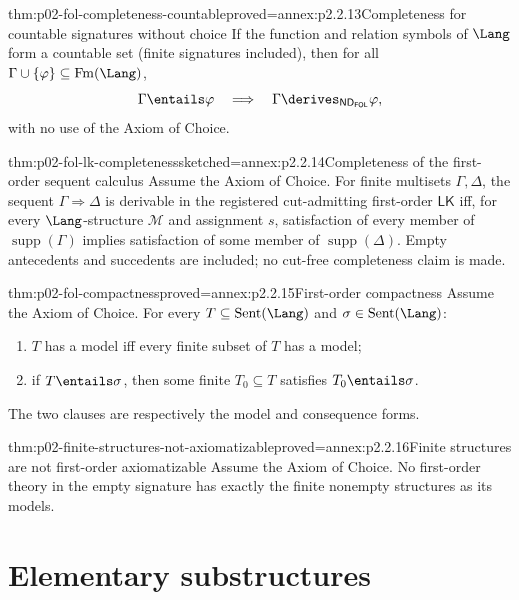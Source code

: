 \begin{hbcorollary}{thm:p02-fol-completeness-countable}{proved=annex:p2.2.13}{Completeness for countable signatures without choice}
If the function and relation symbols of \(\Lang\) form a countable set
(finite signatures included), then for all
\(\Gamma\cup\{\varphi\}\subseteq\operatorname{Fm}(\Lang)\),
\[
 \Gamma\entails\varphi
 \quad\Longrightarrow\quad
 \Gamma\derives_{\mathsf{ND}_{\mathsf{FOL}}}\varphi,
\]
with no use of the Axiom of Choice.
\end{hbcorollary}

\begin{hbtheorem}{thm:p02-fol-lk-completeness}{sketched=annex:p2.2.14}{Completeness of the first-order sequent calculus}
Assume the Axiom of Choice.  For finite multisets \(\Gamma,\Delta\), the
sequent \(\Gamma\Rightarrow\Delta\) is derivable in the registered
cut-admitting first-order \(\mathsf{LK}\) iff, for every \(\Lang\)-structure
\(\mathcal M\) and assignment \(s\), satisfaction of every member of
\(\operatorname{supp}(\Gamma)\) implies satisfaction of some member of
\(\operatorname{supp}(\Delta)\).  Empty antecedents and succedents are
included; no cut-free completeness claim is made.
\end{hbtheorem}

\begin{hbtheorem}{thm:p02-fol-compactness}{proved=annex:p2.2.15}{First-order compactness}
Assume the Axiom of Choice.  For every
\(T\subseteq\operatorname{Sent}(\Lang)\) and
\(\sigma\in\operatorname{Sent}(\Lang)\):
\begin{enumerate}
  \item \(T\) has a model iff every finite subset of \(T\) has a model;
  \item if \(T\entails\sigma\), then some finite \(T_0\subseteq T\)
        satisfies \(T_0\entails\sigma\).
\end{enumerate}
The two clauses are respectively the model and consequence forms.
\end{hbtheorem}

\begin{hbcorollary}{thm:p02-finite-structures-not-axiomatizable}{proved=annex:p2.2.16}{Finite structures are not first-order axiomatizable}
Assume the Axiom of Choice.  No first-order theory in the empty signature
has exactly the finite nonempty structures as its models.
\end{hbcorollary}

\section{Elementary substructures}
\label{sec:p02-first-order-elementary-substructures}

